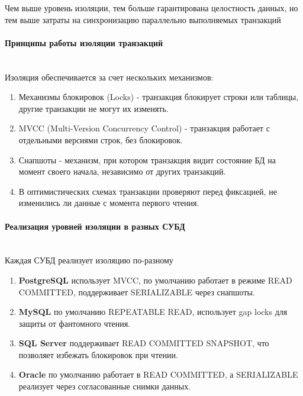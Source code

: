  Чем выше уровень изоляции, тем больше гарантирована целостность данных, но тем выше затраты на синхронизацию параллельно выполняемых транзакций

 \paragraph{Принципы работы изоляции транзакций} ~\\

 Изоляция обеспечивается за счет нескольких механизмов:
 \begin{enumerate}
     \item Механизмы блокировок (Locks) - транзакция блокирует строки или таблицы, другие транзакции не могут их изменять.
     \item MVCC (Multi-Version Concurrency Control) - транзакция работает с отдельными версиями строк, без блокировок.
     \item Снапшоты - механизм, при котором транзакция видит состояние БД на момент своего начала, независимо от других транзакций.
     \item В оптимистических схемах транзакции проверяют перед фиксацией, не изменились ли данные с момента первого чтения.
 \end{enumerate}
 
 \paragraph{Реализация уровней изоляции в разных СУБД} ~\\
 
 Каждая СУБД реализует изоляцию по-разному \autocites[§2]{PostgreSQLdocc13}[§17.7.2.1]{Mysqldoc4}{MicrosoftLearnSQLserverIsolation}{oracledbdoc5}
 
 \begin{enumerate}
     \item \textbf{PostgreSQL} использует MVCC, по умолчанию работает в режиме READ COMMITTED, поддерживает SERIALIZABLE через снапшоты.
     \item \textbf{MySQL} по умолчанию REPEATABLE READ, использует gap locks для защиты от фантомного чтения.
     \item \textbf{SQL Server} поддерживает READ COMMITTED SNAPSHOT, что позволяет избежать блокировок при чтении.
     \item \textbf{Oracle} по умолчанию работает в READ COMMITTED, а SERIALIZABLE реализует через согласованные снимки данных.
 \end{enumerate}
 
